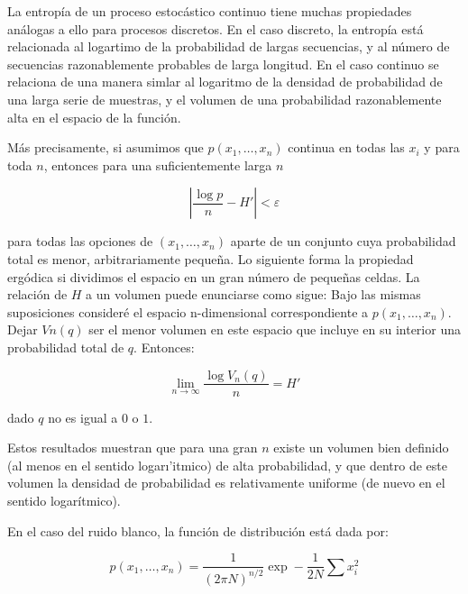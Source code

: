 La entrop\'ia de un proceso estoc\'astico continuo tiene muchas propiedades an\'alogas a ello para procesos discretos. En el caso discreto, la entrop\'ia est\'a relacionada al logartimo de la probabilidad de largas secuencias, y al n\'umero de secuencias razonablemente probables de larga longitud. En el caso continuo se relaciona de una manera simlar al logaritmo de la densidad de probabilidad de una larga serie de muestras, y el volumen de una probabilidad razonablemente alta en el espacio de la funci\'on.


M\'as precisamente, si asumimos que $p\left ( x_{1},\dots ,x_{n} \right )$ continua en todas las $x_{i}$ y para toda $n$, entonces para una suficientemente larga $n$

\begin{equation}
\left | \frac{\log p}{n} - {H}'\right |< \varepsilon 
\end{equation}

para todas las opciones de $\left ( x_{1},\dots ,x_{n} \right )$ aparte de un conjunto cuya probabilidad total es menor, arbitrariamente peque\~na. Lo siguiente forma la propiedad erg\'odica si dividimos el espacio en un gran n\'umero de peque\~nas celdas. La relaci\'on de $H$ a un volumen puede enunciarse como sigue: Bajo las mismas suposiciones consider\'e el espacio n-dimensional correspondiente a $p\left ( x_{1},\dots ,x_{n} \right )$. Dejar $Vn\left ( 	q \right )$ ser el menor volumen en este espacio que incluye en su interior una probabilidad total de $q$. Entonces:

\begin{equation}
\lim_{n\rightarrow \infty }\frac{\log V_{n}\left ( q \right )}{n}={H}'
\end{equation}

dado $q$ no es igual a $0$ o $1$.


Estos resultados muestran que para una gran $n$ existe un volumen bien definido (al menos en el sentido logar\i'itmico) de alta probabilidad, y que dentro de este volumen la densidad de probabilidad es relativamente uniforme (de nuevo en el sentido logar\'itmico).


En el caso del ruido blanco, la funci\'on de distribuci\'on est\'a dada por:

\begin{equation}
p\left ( x_{1}, \ldots ,x_{n}\right )=\frac{1}{\left ( 2\pi N \right )^{n/2}}\exp -\frac{1}{2N}\sum x_{i}^{2}
\end{equation}

